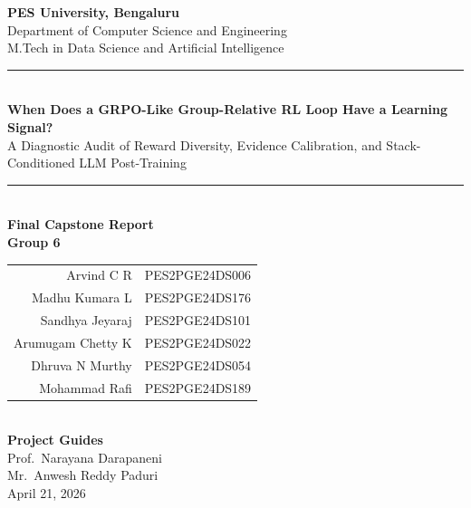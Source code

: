 \documentclass[12pt,a4paper]{report}
\newcommand{\projecttitle}{When Does a GRPO-Like Group-Relative RL Loop Have a Learning Signal?}
\newcommand{\projectsubtitle}{A Diagnostic Audit of Reward Diversity, Evidence Calibration, and Stack-Conditioned LLM Post-Training}
\begin{document}
\hypersetup{pageanchor=false}
\begin{titlepage}
  \centering
  \vspace*{1.2cm}
  {\LARGE\bfseries PES University, Bengaluru}\\[0.35cm]
  {\large Department of Computer Science and Engineering}\\[0.25cm]
  {\large M.Tech in Data Science and Artificial Intelligence}\\[1.8cm]

  \rule{\textwidth}{1.2pt}\\[0.55cm]
  {\Huge\bfseries \projecttitle}\\[0.35cm]
  {\Large \projectsubtitle}\\[0.55cm]
  \rule{\textwidth}{1.2pt}\\[1.4cm]

  {\Large\bfseries Final Capstone Report}\\[1.0cm]

  {\large\bfseries Group 6}\\[0.35cm]
  \begin{tabular}{rl}
    Arvind C R & PES2PGE24DS006\\
    Madhu Kumara L & PES2PGE24DS176\\
    Sandhya Jeyaraj & PES2PGE24DS101\\
    Arumugam Chetty K & PES2PGE24DS022\\
    Dhruva N Murthy & PES2PGE24DS054\\
    Mohammad Rafi & PES2PGE24DS189\\
  \end{tabular}\\[1.0cm]

  {\large\bfseries Project Guides}\\[0.25cm]
  Prof.\ Narayana Darapaneni\\
  Mr.\ Anwesh Reddy Paduri\\[1.0cm]

  \vfill
  {\large April 21, 2026}
\end{titlepage}
\hypersetup{pageanchor=true}

\end{document}
